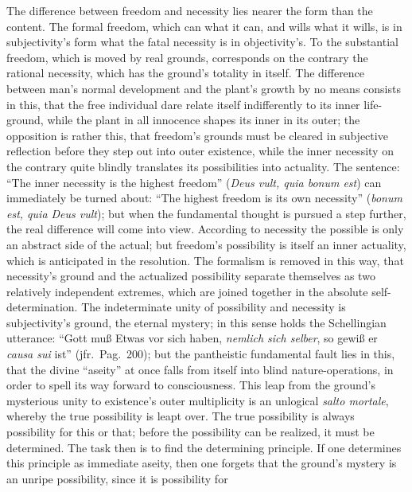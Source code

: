 \documentclass[12pt]{book}
\begin{document}
The difference between freedom and necessity lies nearer the form than the
content. The formal freedom, which can what it can, and wills what it wills,
is in subjectivity's form what the fatal necessity is in objectivity's. To
the substantial freedom, which is moved by real grounds, corresponds on the
contrary the rational necessity, which has the ground's totality in itself.
The difference between man's normal development and the plant's growth by no
means consists in this, that the free individual dare relate itself
indifferently to its inner life-ground, while the plant in all innocence
shapes its inner in its outer; the opposition is rather this, that freedom's
grounds must be cleared in subjective reflection before they step out into
outer existence, while the inner necessity on the contrary quite blindly
translates its possibilities into actuality. The sentence: ``The inner
necessity is the highest freedom'' (\textit{Deus vult, quia bonum est}) can
immediately be turned about: ``The highest freedom is its own necessity''
(\textit{bonum est, quia Deus vult}); but when the fundamental thought is
pursued a step further, the real difference will come into view. According
to necessity the possible is only an abstract side of the actual; but
freedom's possibility is itself an inner actuality, which is anticipated in
the resolution. The formalism is removed in this way, that necessity's
ground and the actualized possibility separate themselves as two relatively
independent extremes, which are joined together in the absolute
self-determination. The indeterminate unity of possibility and necessity is
subjectivity's ground, the eternal mystery; in this sense holds the
Schellingian utterance: ``Gott muß Etwas vor sich haben, \emph{nemlich sich
selber}, so gewiß er \textit{causa sui} ist'' (jfr.\ Pag.\ 200); but the
pantheistic fundamental fault lies in this, that the divine ``aseity'' at
once falls from itself into blind nature-operations, in order to spell its
way forward to consciousness. This leap from the ground's mysterious unity
to existence's outer multiplicity is an unlogical \textit{salto mortale},
whereby the true possibility is leapt over. The true possibility is always
possibility for this or that; before the possibility can be realized, it
must be determined. The task then is to find the determining principle. If
one determines this principle as immediate aseity, then one forgets that the
ground's mystery is an unripe possibility, since it is possibility for
\end{document}
